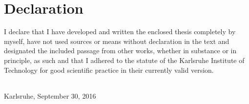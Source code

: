 \thispagestyle{empty}


\vspace*{8cm}


\section*{Declaration}

 I declare that I have developed and written the enclosed thesis completely by myself, have not used sources or means without declaration in the text and designated the included passage from other works, whether in substance or in principle, as such and that I adhered to the statute of the Karlsruhe Institute of Technology for good scientific practice in their currently valid version.


~\\[2ex] 
\noindent
Karlsruhe, September 30, 2016
~\\[5ex]
